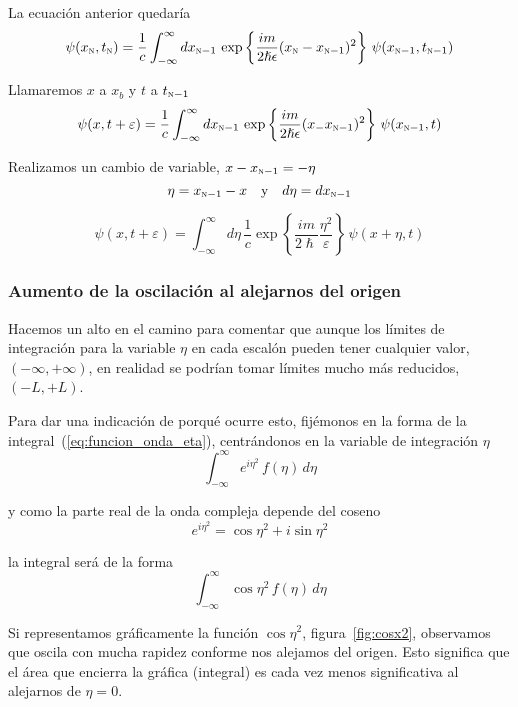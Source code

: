 La ecuación anterior quedaría
\[
  \psi(x_{\textsc{n}},t_{\textsc{n}})
  =
  \dfrac{1}{c}
  \int_{-\infty}^{\infty} dx_{\textsc{n}-1}\,
  \exp\left\{
    \frac{im}{2\hslash\epsilon}
    (x_{\textsc{n}}-x_{\textsc{n}-1})^2
  \right\}
  \,
  \psi(x_{\textsc{n}-1},t_{\textsc{n}-1})
\]

Llamaremos $x$ a $x_b$ y $t$ a $t_{\textsc{n}-1}$
\[
  \psi(x,t+\varepsilon)
  =
  \dfrac{1}{c}
  \int_{-\infty}^{\infty} dx_{\textsc{n}-1}\,
  \exp\left\{
    \frac{im}{2\hslash\epsilon}
    (x_-x_{\textsc{n}-1})^2
  \right\}
  \,
  \psi(x_{\textsc{n}-1},t)
\]

Realizamos un cambio de variable, $x-x_{\textsc{n}-1} = -\eta$
\[
  \eta = x_{\textsc{n}-1} - x
  \hspace{1em}\text{y}\hspace{1em}
  d\eta = dx_{\textsc{n}-1}
\]

\begin{equation}\label{eq:funcion_onda_eta}
  \psi(x,t+\varepsilon)
  =
  \int_{-\infty}^{\infty} d\eta\, \dfrac{1}{c} \exp\left\{\frac{im}{2\hslash}\dfrac{\eta^2}{\varepsilon}\right\} \,\psi(x+\eta,t)
\end{equation}

\subsubsection{Aumento de la oscilación al alejarnos del origen}
Hacemos un alto en el camino para comentar que aunque los límites de
integración para la variable $\eta$ en cada escalón pueden tener
cualquier valor, $(-\infty,+\infty)$, en realidad se podrían tomar
límites mucho más reducidos, $(-L,+L)$.

Para dar una indicación de porqué ocurre esto, fijémonos en la forma
de la integral~(\ref{eq:funcion_onda_eta}), centrándonos en la
variable de integración $\eta$
\[
  \int_{-\infty}^{\infty} e^{i\eta^2}\,f(\eta)\,d\eta
\]

y como la parte real de la onda compleja depende del coseno
\[
  e^{i\eta^2} = \cos\eta^2 + i\sin\eta^2
\]

la integral será de la forma
\[
  \int_{-\infty}^{\infty} \cos\eta^2\,f(\eta)\,d\eta
\]

Si representamos gráficamente la función $\cos\eta^2$,
figura~\ref{fig:cosx2}, observamos que oscila con mucha rapidez
conforme nos alejamos del origen. Esto significa que el área que
encierra la gráfica (integral) es cada vez menos significativa al
alejarnos de $\eta=0$.

